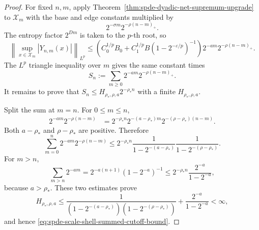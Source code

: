 \begin{proof}
For fixed \(n,m\), apply
Theorem~\ref{thm:spde-dyadic-net-supremum-upgrade} to \(\mathcal X_m\) with
the base and edge constants multiplied by
\[
  2^{-\sigma m}2^{-\rho(n-m)_+}.
\]
The entropy factor \(2^{Dm}\) is taken to the \(p\)-th root, so
\[
  \left\|
    \sup_{x\in\mathcal X_m}|Y_{n,m}(x)|
  \right\|_{L^p}
  \leq
  \left(
    C_0^{1/p}B_0+
    C_1^{1/p}B(1-2^{-\varepsilon/p})^{-1}
  \right)
  2^{-a m}2^{-\rho(n-m)_+}.
\]
The \(L^p\) triangle inequality over \(m\) gives the same constant times
\[
  S_n:=\sum_{m\geq0}2^{-a m}2^{-\rho(n-m)_+}.
\]
It remains to prove that \(S_n\leq H_{\rho_*,\rho,a}2^{-\rho_* n}\) with a
finite \(H_{\rho_*,\rho,a}\).

Split the sum at \(m=n\).  For \(0\leq m\leq n\),
\[
\begin{aligned}
  2^{-a m}2^{-\rho(n-m)}
  &=
  2^{-\rho_* n}
  2^{-(a-\rho_*)m}
  2^{-(\rho-\rho_*)(n-m)} .
\end{aligned}
\]
Both \(a-\rho_*\) and \(\rho-\rho_*\) are positive.  Therefore
\[
  \sum_{m=0}^{n}2^{-a m}2^{-\rho(n-m)}
  \leq
  2^{-\rho_* n}
  \frac{1}{1-2^{-(a-\rho_*)}}
  \frac{1}{1-2^{-(\rho-\rho_*)}} .
\]
For \(m>n\),
\[
  \sum_{m>n}2^{-a m}
  =
  2^{-a(n+1)}(1-2^{-a})^{-1}
  \leq
  2^{-\rho_* n}
  \frac{2^{-a}}{1-2^{-a}},
\]
because \(a>\rho_*\).  These two estimates prove
\[
  H_{\rho_*,\rho,a}
  \leq
  \frac{1}{(1-2^{-(a-\rho_*)})(1-2^{-(\rho-\rho_*)})}
  +
  \frac{2^{-a}}{1-2^{-a}}
  <\infty,
\]
and hence \eqref{eq:spde-scale-shell-summed-cutoff-bound}.
\end{proof}


